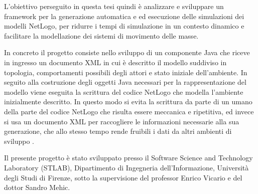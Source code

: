 L'obiettivo perseguito in questa tesi quindi è analizzare e sviluppare un framework per la generazione automatica e ed esecuzione delle simulazioni dei modelli NetLogo, per ridurre i tempi di simulazione in un contesto dinamico e facilitare la modellazione dei sistemi di movimento delle masse.

In concreto il progetto consiste nello sviluppo di un componente Java che riceve in ingresso un documento XML in cui è descritto il modello suddiviso in topologia, comportamenti possibili degli attori e stato iniziale dell'ambiente. In seguito alla costruzione degli oggetti Java necessari per la rappresentazione del modello viene eseguita la scrittura del codice NetLogo che modella l'ambiente inizialmente descritto. In questo modo si evita la scrittura da parte di un umano della parte del codice NetLogo che risulta essere meccanica e ripetitiva, ed invece si usa un documento XML per raccogliere le informazioni necessarie alla sua generazione, che allo stesso tempo rende fruibili i dati da altri ambienti di sviluppo .

Il presente progetto è stato sviluppato presso il Software Science and Technology Laboratory (STLAB), Dipartimento di Ingegneria dell'Informazione, Università degli Studi di Firenze, sotto la supervisione del professor Enrico Vicario e del dottor Sandro Mehic.
 